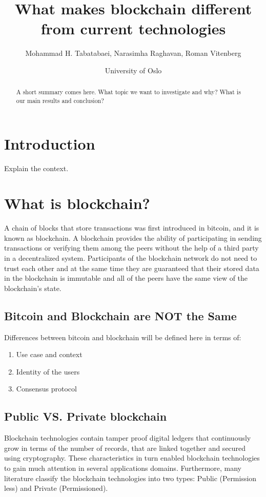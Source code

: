 \documentclass[a4paper]{article}
\title{What makes blockchain different from current technologies}
\author{Mohammad H. Tabatabaei, Narasimha Raghavan, Roman Vitenberg}
\date{University of Oslo}
\begin{document}
\maketitle

\begin{abstract}
A short summary comes here. What topic we want to investigate and why? What is our main results and conclusion?
\end{abstract}

\section{Introduction}
\label{sec:introduction}

Explain the context.

\section{What is blockchain?}
\label{sec:wib}

A chain of blocks that store transactions was first introduced in bitcoin, and it is known as blockchain. A blockchain provides the ability of participating in sending transactions or verifying them among the peers without the help of a third party in a decentralized system. Participants of the blockchain network do not need to trust each other and at the same time they are guaranteed that their stored data in the blockchain is immutable and all of the peers have the same view of the blockchain's state. 

\subsection{Bitcoin and Blockchain are NOT the Same}
\label{sec:bitcoinandblockchain}

Differences between bitcoin and blockchain will be defined here in terms of:
\begin{enumerate}
\item Use case and context
\item Identity of the users
\item Consensus protocol 
\end{enumerate}

\subsection{Public VS. Private blockchain}
\label{sec:publicvsprivate}

Blockchain technologies contain tamper proof digital ledgers that continuously grow in terms of the number of records, that are linked together and secured using cryptography. These characteristics in turn enabled blockchain technologies to  gain much attention in several applications domains. Furthermore, many literature classify the blockchain technologies into two types: Public (Permission less) and Private (Permissioned). 
\end{document}

